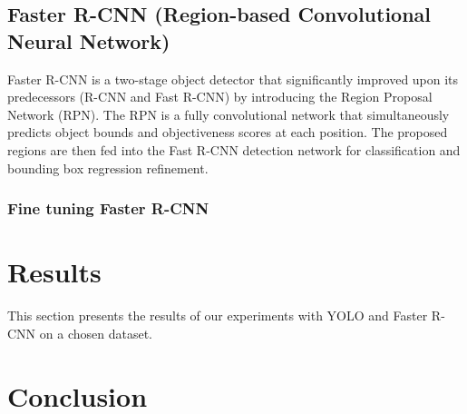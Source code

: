\documentclass[12pt,a4paper]{article}
\begin{document}
\subsection{Faster R-CNN (Region-based Convolutional Neural Network)}
\label{ssec:fastrcnn}
Faster R-CNN is a two-stage object detector that significantly improved upon its predecessors (R-CNN and Fast R-CNN) by introducing the Region Proposal Network (RPN). The RPN is a fully convolutional network that simultaneously predicts object bounds and objectiveness scores at each position. The proposed regions are then fed into the Fast R-CNN detection network for classification and bounding box regression refinement. 

\subsubsection{Fine tuning Faster R-CNN}

\section{Results}
\label{sec:results}
This section presents the results of our experiments with YOLO and Faster R-CNN on a chosen dataset. 

\section{Conclusion}
\label{sec:conclusion}



\label{sec:literature}
\end{document}
